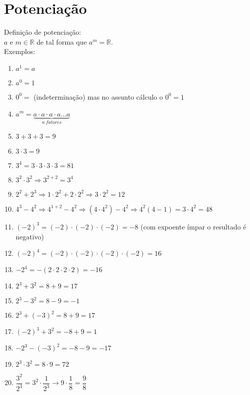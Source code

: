 \section{Potenciação}
Definição de potenciação:\\

$ a $ e $ m \in \mathbb{R} $ de tal forma que $ a^m = \mathbb{R}$.\\

Exemplos:

\begin{enumerate}[label=\alph*)]
\item $ a^{1} = a $
\item $ a^{0} = 1 $
\item $ 0^{0} = $ \textquestiondown (indeterminação) mas no assunto cálculo o $ 0^{0} = 1$
\item $ a^{m} = \underbrace{a \cdot a \cdot a \cdot a \ldots a}_{n\  fatores} $
\item $ 3 + 3 + 3 = 9 $
\item $ 3 \cdot 3 = 9 $
\item $ 3^{4} = 3\cdot 3\cdot 3\cdot 3 = 81 $
\item $ 3^{2} \cdot 3^{2} \Longrightarrow 3^{2+2} = 3^{4} $
\item $ 2^{2} + 2^{3} \Longrightarrow 1 \cdot 2^{2} + 2 \cdot 2^{2} \Longrightarrow 3 \cdot 2^{2} = 12 $
\item $ 4^{3} - 4^{2} \Longrightarrow 4^{1+2} - 4^{2} \Longrightarrow (4 \cdot 4^{2}) - 4^{2} \Longrightarrow 4^{2}(4 - 1) = 3 \cdot 4^{2} = 48 $
\item $ (-2)^{3} = (-2)\cdot (-2)\cdot (-2) = -8 $ (com expoente ímpar o resultado é negativo) 
\item $ (-2)^{4} = (-2)\cdot (-2)\cdot (-2)\cdot (-2) = 16 $
\item $ -2^{4} = -(2\cdot 2\cdot 2\cdot 2) = -16 $
\item $ 2^{3} + 3^{2} = 8 + 9 = 17 $
\item $ 2^{3} - 3^{2} = 8 - 9 = -1 $
\item $ 2^{3} + (-3)^{2} = 8 + 9 = 17 $
\item $ (-2)^{3} + 3^{2} = -8 + 9 = 1 $
\item $ -2^{3} - (-3)^{2} = -8 - 9 = -17 $
\item $ 2^{3} \cdot 3^{2} = 8 \cdot 9 = 72 $
\item $ \dfrac{3^{2}}{2^{3}} = 3^{2}\cdot \dfrac{1}{2^{3}} \longrightarrow 9 \cdot \dfrac{1}{8} = \dfrac{9}{8}$
\end{enumerate}

